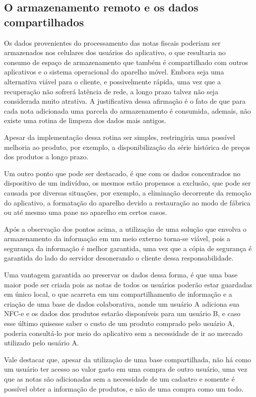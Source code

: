\subsection{O armazenamento remoto e os dados compartilhados}

Os dados provenientes do processamento das notas fiscais poderiam ser armazenados nos celulares dos usuários do aplicativo, o que resultaria no consumo de espaço de armazenamento que também é compartilhado com outros aplicativos e o sistema operacional do aparelho móvel. Embora seja uma alternativa viável para o cliente, e possivelmente rápida, uma vez que a recuperação não sofrerá latência de rede, a longo prazo talvez não seja considerada muito atrativa. A justificativa dessa afirmação é o fato de que para cada nota adicionada uma parcela do armazenamento é consumida, ademais, não existe uma rotina de limpeza dos dados mais antigos.

Apesar da implementação dessa rotina ser simples, restringiria uma possível melhoria ao produto, por exemplo, a disponibilização da série histórica de preços dos produtos a longo prazo.

Um outro ponto que pode ser destacado, é que com os dados concentrados no dispositivo de um indivíduo, os mesmos estão propensos a exclusão, que pode ser causada por diversas situações, por exemplo, a eliminação decorrente da remoção do aplicativo, a formatação do aparelho devido a restauração ao modo de fábrica ou até mesmo uma pane no aparelho em certos casos.

Após a observação dos pontos acima, a utilização de uma solução que envolva o armazenamento da informação em um meio externo torna-se viável, pois a segurança da informação é melhor garantida, uma vez que a cópia de segurança é garantida do lado do servidor desonerando o cliente dessa responsabilidade.

Uma vantagem garantida ao preservar os dados dessa forma, é que uma base maior pode ser criada pois as notas de todos os usuários poderão estar guardadas em único local, o que acarreta em um compartilhamento de informação e a criação de uma base de dados colaborativa, aonde um usuário A adiciona sua NFC-e e os dados dos produtos estarão disponíveis para um usuário B, e caso esse último quisesse saber o custo de um produto comprado pelo usuário A, poderia consultá-lo por meio do aplicativo sem a necessidade de ir ao mercado utilizado pelo usuário A.

Vale destacar que, apesar da utilização de uma base compartilhada, não há como um usuário ter acesso ao valor gasto em uma compra de outro usuário, uma vez que as notas são adicionadas sem a necessidade de um cadastro e somente é possível obter a informação de produtos, e não de uma compra como um todo.

